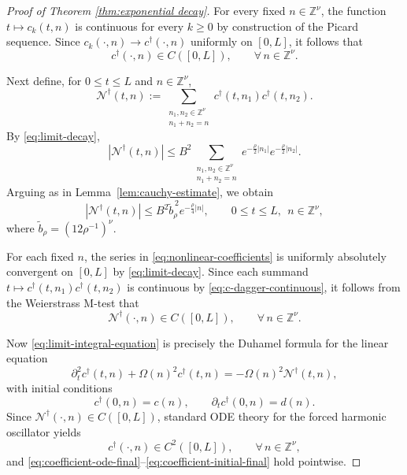 \documentclass[10pt,a4paper]{amsart}
\begin{document}
\begin{proof}[Proof of Theorem \ref{thm:exponential decay}]
For every fixed $n\in \mathbb{Z}^{\nu}$, the function $t\mapsto c_k(t,n)$ is continuous
for every $k\geq 0$ by construction of the Picard sequence. Since
$c_k(\cdot,n)\to c^{\dagger}(\cdot,n)$ uniformly on $[0,L]$, it follows that
\begin{equation}\label{eq:c-dagger-continuous}
c^{\dagger}(\cdot,n)\in C([0,L]),
\qquad \forall\, n\in \mathbb{Z}^{\nu}.
\end{equation}

Next define, for $0\leq t\leq L$ and $n\in \mathbb{Z}^{\nu}$,
\begin{equation}\label{eq:nonlinear-coefficients}
\mathcal{N}^{\dagger}(t,n)
:=
\sum_{\substack{n_1,n_2\in \mathbb{Z}^{\nu}\\ n_1+n_2=n}}
c^{\dagger}(t,n_1)c^{\dagger}(t,n_2).
\end{equation}
By \eqref{eq:limit-decay},
\[
|\mathcal{N}^{\dagger}(t,n)|
\leq
B^2
\sum_{\substack{n_1,n_2\in \mathbb{Z}^{\nu}\\ n_1+n_2=n}}
e^{-\frac{\rho}{2}|n_1|}e^{-\frac{\rho}{2}|n_2|}.
\]
Arguing as in Lemma~\ref{lem:cauchy-estimate}, we obtain
\begin{equation}\label{eq:N-dagger-decay}
|\mathcal{N}^{\dagger}(t,n)|
\leq
B^2 \widetilde b_{\rho}^{\,2} e^{-\frac{\rho}{4}|n|},
\qquad
0\leq t\leq L,\ \ n\in \mathbb{Z}^{\nu},
\end{equation}
where $\widetilde b_{\rho}=(12\rho^{-1})^{\nu}$.

For each fixed $n$, the series in \eqref{eq:nonlinear-coefficients} is uniformly
absolutely convergent on $[0,L]$ by \eqref{eq:limit-decay}. Since each summand
$t\mapsto c^{\dagger}(t,n_1)c^{\dagger}(t,n_2)$ is continuous by
\eqref{eq:c-dagger-continuous}, it follows from the Weierstrass M-test that
\begin{equation*}
\mathcal{N}^{\dagger}(\cdot,n)\in C([0,L]),
\qquad \forall\, n\in \mathbb{Z}^{\nu}.
\end{equation*}

Now \eqref{eq:limit-integral-equation} is precisely the Duhamel formula for the linear
equation
\begin{equation}\label{eq:coefficient-ode-final}
\partial_t^2 c^{\dagger}(t,n)
+\Omega(n)^2 c^{\dagger}(t,n)
=
-\Omega(n)^2 \mathcal{N}^{\dagger}(t,n),
\end{equation}
with initial conditions
\begin{equation}\label{eq:coefficient-initial-final}
c^{\dagger}(0,n)=c(n),
\qquad
\partial_t c^{\dagger}(0,n)=d(n).
\end{equation}
Since $\mathcal{N}^{\dagger}(\cdot,n)\in C([0,L])$, standard ODE theory for the forced
harmonic oscillator yields
\begin{equation*}
c^{\dagger}(\cdot,n)\in C^2([0,L]),
\qquad \forall\, n\in \mathbb{Z}^{\nu},
\end{equation*}
and \eqref{eq:coefficient-ode-final}--\eqref{eq:coefficient-initial-final} hold pointwise.


\end{proof}
\end{document}
